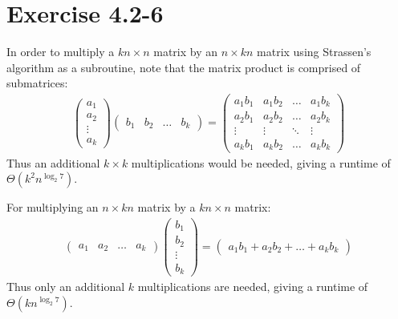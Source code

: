 \documentclass{article}
\begin{document}
\section*{Exercise 4.2-6}

In order to multiply a $k n \times n$ matrix by an $n \times k n$ matrix using Strassen's algorithm as a subroutine, note that the matrix product is comprised of submatrices:
\begin{eqnarray*}
\left (
	\begin{array}{c}
	a_1 \\
	a_2 \\
	\vdots \\
	a_k
	\end{array}
\right )
\left (
	\begin{array}{cccc}
	b_1 & b_2 & \ldots & b_k
	\end{array}
\right )
=
\left (
	\begin{array}{cccc}
	a_1 b_1 & a_1 b_2 & \ldots & a_1 b_k \\
	a_2 b_1 & a_2 b_2 & \ldots & a_2 b_k \\
	\vdots  & \vdots  & \ddots & \vdots \\
	a_k b_1 & a_k b_2 & \ldots & a_k b_k
	\end{array}
\right )
\end{eqnarray*}
Thus an additional $k \times k$ multiplications would be needed, giving a runtime of $\Theta(k^2 n^{\log_2{7}})$.

For multiplying an $n \times k n$ matrix by a $k n \times n$ matrix:
\begin{eqnarray*}
\left (
	\begin{array}{cccc}
	a_1 & a_2 & \ldots & a_k
	\end{array}
\right )
\left (
	\begin{array}{c}
	b_1 \\
	b_2 \\
	\vdots \\
	b_k
	\end{array}
\right )
=
\left (
	\begin{array}{c}
	a_1 b_1 + a_2 b_2 + \ldots + a_k b_k
	\end{array}
\right )
\end{eqnarray*}
Thus only an additional $k$ multiplications are needed, giving a runtime of $\Theta(k n^{\log_2{7}})$.
\end{document}
